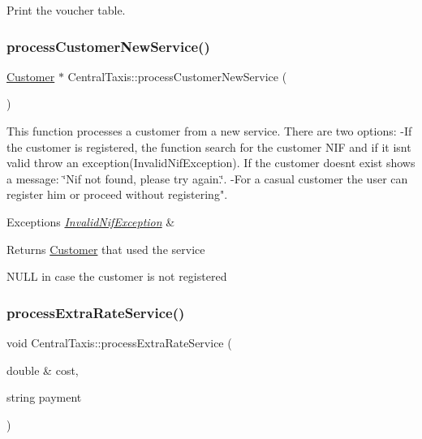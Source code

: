 Print the voucher table. \hypertarget{classCentralTaxis_ab73c78ec721497c927b5a9201f83372d}{}\label{classCentralTaxis_ab73c78ec721497c927b5a9201f83372d} 
\subsubsection{\texorpdfstring{process\+Customer\+New\+Service()}{processCustomerNewService()}}
{\footnotesize\ttfamily \hyperlink{classCustomer}{Customer} $\ast$ Central\+Taxis\+::process\+Customer\+New\+Service (\begin{DoxyParamCaption}{ }\end{DoxyParamCaption})}

This function processes a customer from a new service. There are two options\+: -\/\+If the customer is registered, the function search for the customer N\+IF and if it isn\textquotesingle{}t valid throw an exception(\+Invalid\+Nif\+Exception). If the customer doesn\textquotesingle{}t exist shows a message\+: \char`\"{}\+Nif not found, please try again.\char`\"{}. -\/\+For a casual customer the user can register him or proceed without registering". 
\begin{DoxyExceptions}{Exceptions}
{\em \hyperlink{classInvalidNifException}{Invalid\+Nif\+Exception}} & \\
\hline
\end{DoxyExceptions}
\begin{DoxyReturn}{Returns}
\hyperlink{classCustomer}{Customer} that used the service 

N\+U\+LL in case the customer is not registered 
\end{DoxyReturn}
\hypertarget{classCentralTaxis_ad262d0a0dabe84a7a8f4f0469e3fa837}{}\label{classCentralTaxis_ad262d0a0dabe84a7a8f4f0469e3fa837} 
\subsubsection{\texorpdfstring{process\+Extra\+Rate\+Service()}{processExtraRateService()}}
{\footnotesize\ttfamily void Central\+Taxis\+::process\+Extra\+Rate\+Service (\begin{DoxyParamCaption}\item[{double \&}]{cost,  }\item[{string}]{payment }\end{DoxyParamCaption})}

